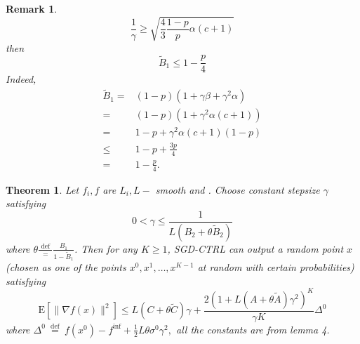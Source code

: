 \documentclass[8pt,a4paper]{article}
\newtheorem{theorem}{Theorem}
\newtheorem{remark}{Remark}
\begin{document}
	\begin{remark}
		$$
		\frac{1}{\gamma} \geq \sqrt{\frac{4}{3} \frac{1-p}{p} \alpha(c+1)}
		$$
		then
		$$
		\tilde{B}_{1} \leq 1-\frac{p}{4}
		$$
		Indeed,
		$$
		\begin{aligned}
			\tilde{B}_{1}=&(1-p)\left(1+\gamma \beta+\gamma^{2} \alpha\right) \\
		{=} &(1-p)\left(1+\gamma^{2} \alpha(c+1)\right) \\
			=& 1-p+\gamma^{2} \alpha(c+1)(1-p) \\
	{\leq} & 1-p+\frac{3 p}{4} \\
			=& 1-\frac{p}{4} .
		\end{aligned}
		$$
	\end{remark}
	
	\begin{theorem}
		Let $f_i,f $ are $L_i, L-$ smooth and . Choose constant stepsize $\gamma$ satisfying
		$$
		0<\gamma \leq \frac{1}{L\left(B_{2}+\theta \tilde{B}_{2}\right)}
		$$
		where $\theta \frac{\text { def }}{=} \frac{B_{1}}{1-\tilde{B}_{1}}$. Then for any $K \geq 1$, SGD-CTRL can output a random point $x$ (chosen as one of the points $x^{0}, x^{1}, \ldots, x^{K-1}$ at random with certain probabilities) satisfying
		$$
		\mathrm{E}\left[\|\nabla f(x)\|^{2}\right] \leq L(C+\theta \tilde{C}) \gamma+\frac{2\left(1+L(A+\theta \tilde{A}) \gamma^{2}\right)^{K}}{\gamma K} \Delta^{0}
		$$
		where $\Delta^{0} \stackrel{\text { def }}{=} f\left(x^{0}\right)-f^{\inf }+\frac{1}{2} L \theta \sigma^{0} \gamma^{2} ,$ all the constants are from  lemma 4.
	\end{theorem}
	
\end{document}
